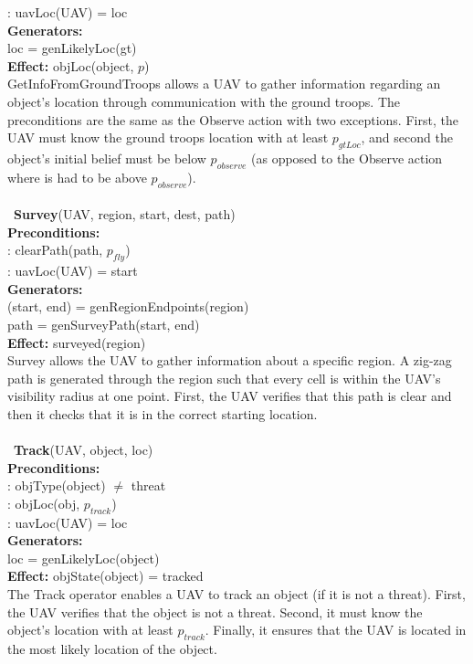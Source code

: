 \documentclass[12pt]{article}
\begin{document}
: uavLoc(UAV) = loc \\
\textbf{Generators:} \\
\indent loc = genLikelyLoc(gt) \\
\textbf{Effect:} objLoc(object, $p$) \\
GetInfoFromGroundTroops allows a UAV to gather information regarding an object's location through communication with the ground troops. The preconditions are the same as the Observe action with two exceptions. First, the UAV must know the ground troops location with at least $p_{gtLoc}$, and second the object's initial belief must be below $p_{observe}$ (as opposed to the Observe action where is had to be above $p_{observe}$).
\\\
\\\
\textbf{Survey}(UAV, region, start, dest, path) \\
\textbf{Preconditions:} \\
\indent 0: clearPath(path, $p_{fly}$) \\
\indent 1: uavLoc(UAV) = start \\
\textbf{Generators:} \\
\indent (start, end) = genRegionEndpoints(region) \\
\indent path = genSurveyPath(start, end) \\
\textbf{Effect:} surveyed(region) \\
Survey allows the UAV to gather information about a specific region. A zig-zag path is generated through the region such that every cell is within the UAV's visibility radius at one point. First, the UAV verifies that this path is clear and then it checks that it is in the correct starting location.
\\\
\\\
\textbf{Track}(UAV, object, loc) \\
\textbf{Preconditions:} \\
: objType(object) $\neq$ threat\\
: objLoc(obj, $p_{track}$) \\
\indent 2: uavLoc(UAV) = loc \\
\textbf{Generators:} \\
\indent loc = genLikelyLoc(object) \\
\textbf{Effect:} objState(object) = tracked \\
The Track operator enables a UAV to track an object (if it is not a threat). First, the UAV verifies that the object is not a threat. Second, it must know the object's location with at least $p_{track}$. Finally, it ensures that the UAV is located in the most likely location of the object.
\end{document}
